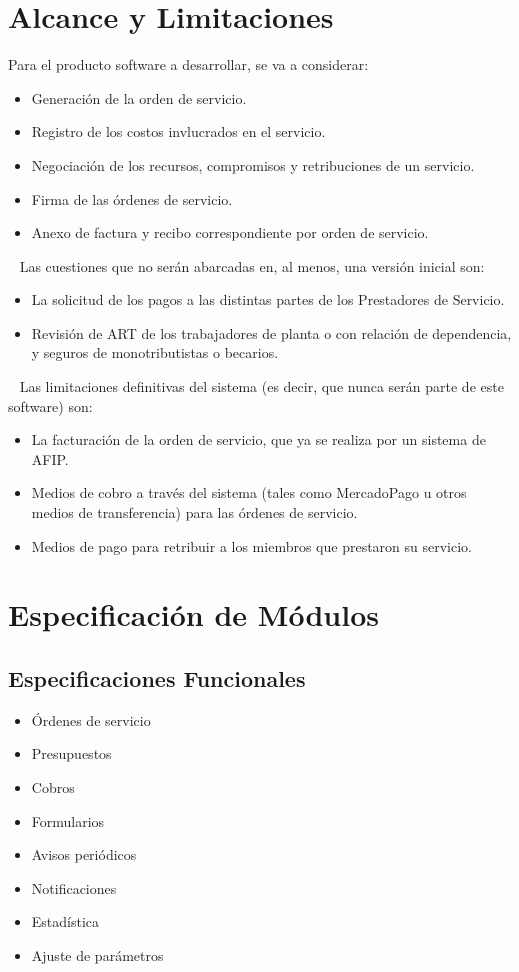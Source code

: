 \section*{Alcance y Limitaciones}
\normalsize{ \indent
Para el producto software a desarrollar, se va
a considerar:
}
\begin{itemize}
	\item Generaci\'on de la orden de servicio.
	\item Registro de los costos invlucrados en
	el servicio.
	\item Negociaci\'on de los recursos,
	compromisos y retribuciones de un servicio.
	\item Firma de las \'ordenes de servicio.
	\item Anexo de factura y recibo
	correspondiente por orden de servicio.
\end{itemize}
\ \newline
\normalsize{ \indent
Las cuestiones que no ser\'an abarcadas en, al
menos, una versi\'on inicial son:
}
\begin{itemize}
	\item La solicitud de los pagos a las
	distintas partes de los Prestadores de
	Servicio.
	\item Revisi\'on de ART de los trabajadores
	de planta o con relaci\'on de dependencia,
	y seguros de monotributistas o becarios.
\end{itemize}
\ \newline
\normalsize{ \indent
Las limitaciones definitivas del sistema (es
decir, que nunca ser\'an parte de este software)
son:
}
\begin{itemize}
	\item La facturaci\'on de la orden de
	servicio, que ya se realiza por un sistema
	de AFIP.
	\item Medios de cobro a trav\'es del sistema
	(tales como MercadoPago u otros medios de
	transferencia) para las \'ordenes de servicio.
	\item Medios de pago para retribuir a los
	miembros que prestaron su servicio.
\end{itemize}
\section*{Especificaci\'on de M\'odulos}
\subsection*{Especificaciones Funcionales}
\begin{itemize}
	\item \'Ordenes de servicio
	\item Presupuestos
	\item Cobros
	\item Formularios
	\item Avisos peri\'odicos
	\item Notificaciones
	\item Estad\'istica
	\item Ajuste de par\'ametros
\end{itemize}
